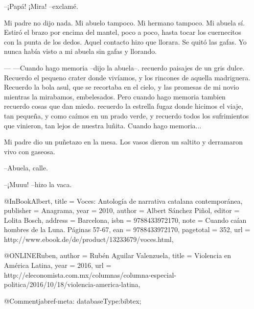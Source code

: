 \documentclass[a3paper]{tufte-handout}
\begin{document}
--¡Papá! ¡Mira! --exclamé.

Mi padre no dijo nada. Mi abuelo tampoco. Mi hermano tampoco. Mi abuela sí. Estiró el brazo por encima del mantel, poco a poco, hasta tocar los cuernecitos con la punta de los dedos. Aquel contacto hizo que llorara. Se quitó las gafas. Yo nunca había visto a mi abuela sin gafas y llorando.

--- ---Cuando hago memoria --dijo la abuela--. recuerdo paisajes de un gris dulce. Recuerdo el pequeno crater donde vivíamos, y los rincones de aquella madriguera. Recuerdo la bola asul, que se recortaba en el cielo, y las promesas de mi novio mientras la mirabamos, embelesados. Pero cuando hago memoria tambien recuerdo cosas que dan miedo. recuerdo la estrella fugaz donde hicimos el viaje, tan pequeña, y como caímos en un prado verde, y recuerdo todos los sufrimientos que vinieron, tan lejos de nuestra luñita. Cuando hago memoria...

Mi padre dio un puñetazo en la mesa. Los vasos dieron un saltito y derramaron vivo con gaseosa.

--Abuela, calle.

--¡Muuu! --hizo la vaca.



\nocite{Albert}




@InBook{Albert,
  title     = {Voces: {A}ntolog\'ia de narrativa catalana contempor\'anea},
  publisher = {Anagrama},
  year      = {2010},
  author    = {Albert S\'anchez Pi{\~n}ol},
  editor    = {Lolita Bosch},
  address   = {Barcelona},
  isbn      = {9788433972170},
  note      = {Cuando ca\'ian hombres de la {L}una. P\'aginas 57-67},
  ean       = {9788433972170},
  pagetotal = {352},
  url       = {http://www.ebook.de/de/product/13233679/voces.html},
}

@ONLINE{Ruben,
author = {Rub\'en Aguilar Valenzuela},
title = {Violencia en {A}mérica {L}atina},
year = {2016},
url = {http://eleconomista.com.mx/columnas/columna-especial-politica/2016/10/18/violencia-america-latina},
}

@Comment{jabref-meta: databaseType:bibtex;}
\end{document}
